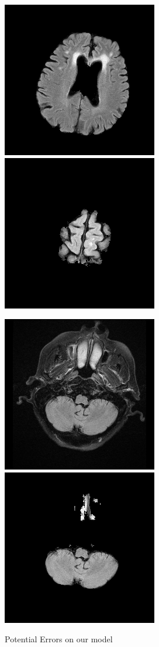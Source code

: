 \documentclass[conference]{IEEEtran}
\begin{document}
\begin{figure}[h!]
\includegraphics[scale = 0.2]{stripped_14.png}
\includegraphics[scale = 0.2]{stripped_21.png}
\end{figure}

\begin{figure}[h!]
\centering 
\caption{Potential Errors on our model}

\hspace{8mm}
\includegraphics[scale = 0.3]{origin_2.png}
\hspace{22mm}
\includegraphics[scale = 0.3]{stripped_2.png}
\end{figure}
\end{document}
